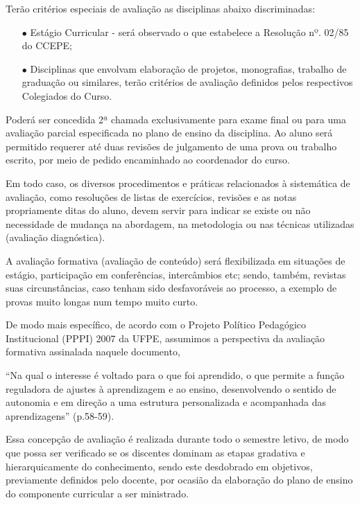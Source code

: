 Terão critérios especiais de avaliação as disciplinas abaixo discriminadas:
\begin{enumerate}
\item[$\bullet$]Estágio Curricular - será observado o que estabelece a Resolução nº. 02/85 do CCEPE;
\item[$\bullet$]Disciplinas que envolvam elaboração de projetos, monografias, trabalho de graduação ou similares, terão critérios de avaliação definidos pelos respectivos Colegiados do Curso.
\end{enumerate}

Poderá ser concedida 2ª chamada exclusivamente para exame final ou para uma avaliação parcial especificada no plano de ensino da disciplina. Ao aluno será permitido requerer até duas revisões de julgamento de uma prova ou trabalho escrito, por meio de pedido encaminhado ao coordenador do curso.

Em todo caso, os diversos procedimentos e práticas relacionados à sistemática de avaliação, como resoluções de listas de exercícios, revisões e as notas propriamente ditas do aluno, devem servir para indicar se existe ou não necessidade de mudança na abordagem, na metodologia ou nas técnicas utilizadas (avaliação diagnóstica). 

A avaliação formativa (avaliação de conteúdo) será flexibilizada em situações de estágio, participação em conferências, intercâmbios etc; sendo, também, revistas suas circunstâncias, caso tenham sido desfavoráveis ao processo, a exemplo de provas muito longas num tempo muito curto. 

De modo mais específico, de acordo com o Projeto Político Pedagógico Institucional (PPPI) 2007 da UFPE, assumimos a perspectiva da avaliação formativa assinalada naquele documento, 

“Na qual o interesse é voltado para o que foi aprendido, o que permite a função reguladora de ajustes à aprendizagem e ao ensino, desenvolvendo o sentido de autonomia e em direção a uma estrutura personalizada e acompanhada das aprendizagens” (p.58-59).

Essa concepção de avaliação é realizada durante todo o semestre letivo, de modo que possa ser verificado se os discentes dominam as etapas gradativa e hierarquicamente do conhecimento, sendo este desdobrado em objetivos, previamente definidos pelo docente, por ocasião da elaboração do plano de ensino do componente curricular a ser ministrado.

